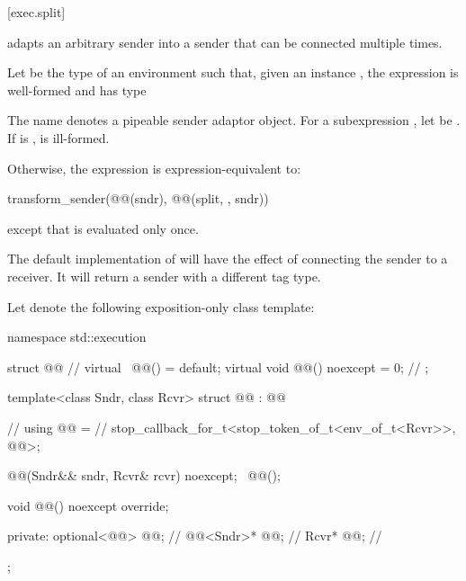 [exec.split]{}

\pnum
{} adapts an arbitrary sender
into a sender that can be connected multiple times.

\pnum
Let  be the type of an environment
such that, given an instance ,
the expression  is well-formed and
has type 

\pnum
The name  denotes a pipeable sender adaptor object.
For a subexpression , let  be .
If  is ,
 is ill-formed.

\pnum
Otherwise, the expression  is expression-equivalent to:
\begin{codeblock}
transform_sender(@@(sndr), @@(split, {}, sndr))
\end{codeblock}
except that  is evaluated only once.
\begin{note}
The default implementation of 
will have the effect of connecting the sender to a receiver.
It will return a sender with a different tag type.
\end{note}

\pnum
Let  denote the following exposition-only class template:

\begin{codeblock}
namespace std::execution {
  struct @@ {                                     // \expos
    virtual ~@@() = default;
    virtual void @@() noexcept = 0;                         // \expos
  };

  template<class Sndr, class Rcvr>
  struct @@ : @@ {                       // \expos
    using @@ =                                    // \expos
      stop_callback_for_t<stop_token_of_t<env_of_t<Rcvr>>, @@>;

    @@(Sndr&& sndr, Rcvr& rcvr) noexcept;
    ~@@();

    void @@() noexcept override;

  private:
    optional<@@> @@;                         // \expos
    @@<Sndr>* @@;                               // \expos
    Rcvr* @@;                                                 // \expos
  };
}
\end{codeblock}

